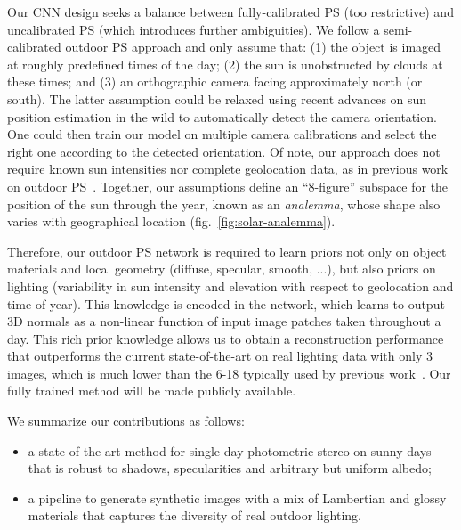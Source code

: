 Our CNN design seeks a balance between fully-calibrated PS (too restrictive) and uncalibrated PS (which introduces further ambiguities). We follow a semi-calibrated outdoor PS approach and only assume that: (1) the object is imaged at roughly predefined times of the day; (2) the sun is unobstructed by clouds at these times; and (3) an orthographic camera facing approximately north (or south). The latter assumption could be relaxed using recent advances on sun position estimation in the wild to automatically detect the camera orientation. One could then train our model on multiple camera calibrations and select the right one according to the detected orientation. Of note, our approach does not require known sun intensities nor complete geolocation data, as in previous work on outdoor PS~\cite{jung-cvpr-15}. Together, our assumptions define an ``8-figure'' subspace for the position of the sun through the year, known as an {\em analemma}, whose shape also varies with geographical location (fig.~\ref{fig:solar-analemma}).



Therefore, our outdoor PS network is required to learn priors not only on object materials and local geometry (diffuse, specular, smooth, ...), but also priors on lighting (variability in sun intensity and elevation with respect to geolocation and time of year). This knowledge is encoded in the network, which learns to output 3D normals as a non-linear function of input image patches taken throughout a day. This rich prior knowledge allows us to obtain a reconstruction performance that outperforms the current state-of-the-art on real lighting data with only 3 images, which is much lower than the 6-18 typically used by previous work~\cite{yu-iccp-13,jung-cvpr-15}. Our fully trained method will be made publicly available.



We summarize our contributions as follows:
\begin{itemize}[noitemsep,nolistsep]
	\item a state-of-the-art method for single-day photometric stereo on sunny days that is robust to shadows, specularities and arbitrary but uniform albedo;
    \item a pipeline to generate synthetic images with a mix of Lambertian and glossy materials that captures the diversity of real outdoor lighting.
\end{itemize}

